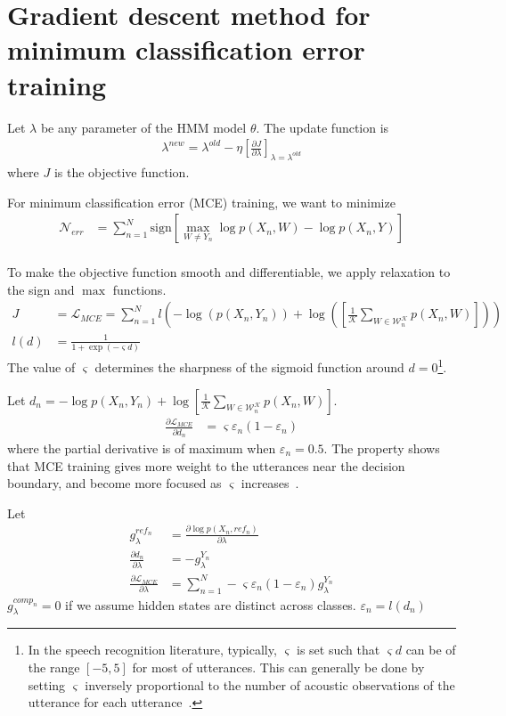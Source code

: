 \chapter{Gradient descent method for minimum classification error training}

Let $\lambda$ be any parameter of the HMM model $\theta$. The update function is
\begin{align}
\lambda^{new} = \lambda^{old} - \eta\left[\frac{\partial J}{\partial \lambda}\right]_{\lambda = \lambda^{old}}
\end{align}
where $J$ is the objective function.

For minimum classification error (MCE) training, we want to minimize~\cite{chang12}
\begin{align*}
\mathcal{N}_{err} &= \sum_{n=1}^N\text{sign}[\max_{W\neq Y_n}\log p(X_n, W) - \log p(X_n, Y)]\\
\end{align*}

To make the objective function smooth and differentiable, we apply relaxation to the sign and $\max$
functions.
\begin{align*}
J &= \mathcal{L}_{MCE} = \sum_{n = 1}^N l(-\log(p(X_n, Y_n)) + 
    \log(\left[\frac{1}{\mathcal{K}}\sum_{W\in \mathcal{W}_n^\mathcal{K}}p(X_n, W)\right])) \\
l(d) &= \frac{1}{1 + \exp(-\varsigma d) }
\end{align*}
The value of $\varsigma$ determines the sharpness of the sigmoid function around $d=0$\footnote{In the speech recognition literature, typically, $\varsigma$ is set such that $\varsigma d$ can be of the range
$[-5, 5]$ for most of utterances. This can generally be done by setting $\varsigma$ inversely proportional to the
number of acoustic observations of the utterance for each utterance~\cite{chang12}.}.

Let $d_n = -\log p(X_n, Y_n) + 
    \log\left[\frac{1}{\mathcal{K}}\sum_{W\in \mathcal{W}_n^\mathcal{K}}p(X_n, W)\right]$.
\begin{align}
\frac{\partial\mathcal{L}_{MCE}}{\partial d_n} &= \varsigma\varepsilon_n(1-\varepsilon_n)
\end{align}
where the partial derivative is of maximum when $\varepsilon_n = 0.5$. The property shows
that MCE training gives more weight to the utterances near the decision boundary, and become more
focused as $\varsigma$ increases~\cite{chang12}.

Let
\begin{align}
g^{ref_n}_\lambda &= \frac{\partial \log p(X_n, ref_n)}{\partial \lambda} \\
\frac{\partial d_n}{\partial \lambda} &= -g^{Y_n}_\lambda \\
\frac{\partial\mathcal{L}_{MCE}}{\partial\lambda} &= \sum_{n=1}^{N}-\varsigma\varepsilon_n(1-\varepsilon_n)g_\lambda^{Y_n}
\end{align}
$g^{comp_n}_\lambda = 0$ if we assume hidden states are distinct across classes. $\varepsilon_n = l(d_n)$

